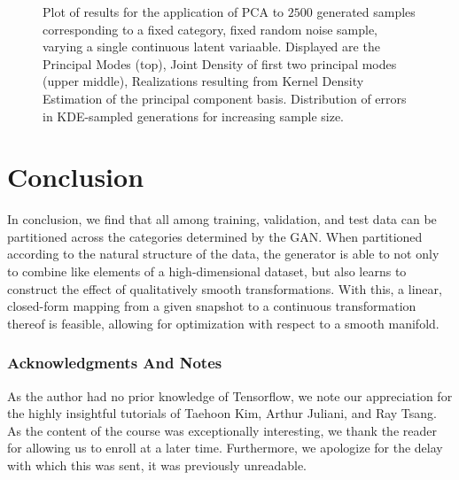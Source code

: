 \documentclass{article}
\begin{document}
\begin{figure}[h]
  \caption{Plot of results for the application of PCA to $2500$ generated samples corresponding to a fixed category, fixed random noise sample, varying a single continuous latent variaable. Displayed are the Principal Modes (top), Joint Density of first two principal modes (upper middle), Realizations resulting from Kernel Density Estimation of the principal component basis.  Distribution of errors in KDE-sampled generations for increasing sample size.}
\end{figure}\label{GenPCA2}




\section{Conclusion}
	In conclusion, we find that all among training, validation, and test data can be partitioned across the categories determined by the GAN.  When partitioned according to the natural structure of the data, the generator is able to not only to combine like elements of a high-dimensional dataset, but also learns to construct the effect of qualitatively smooth transformations.  With this, a linear, closed-form mapping from a given snapshot to a continuous transformation thereof is feasible, allowing for optimization with respect to a smooth manifold.\label{GenPCA2} 

\subsubsection*{Acknowledgments And Notes}

As the author had no prior knowledge of Tensorflow, we note our appreciation for the highly insightful tutorials of Taehoon Kim, Arthur Juliani, and Ray Tsang.  As the content of the course was exceptionally interesting, we thank the reader for allowing us to enroll at a later time. Furthermore, we apologize for the delay with which this was sent, it was previously unreadable.








\end{document}

